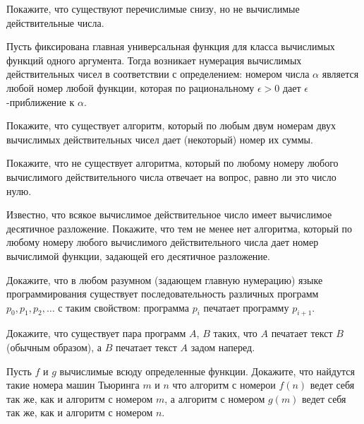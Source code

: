 \begin{task}
    Покажите, что существуют перечислимые снизу, но не вычислимые действительные числа.
\end{task}


\begin{definition}
    Пусть фиксирована главная универсальная функция для класса вычислимых функций одного аргумента. Тогда возникает нумерация
    вычислимых действительных чисел в соответствии с определением: номером числа $\alpha$ является любой номер любой функции,
    которая по рациональному $\epsilon > 0$ дает $\epsilon$-приближение к $\alpha$.
\end{definition}


\begin{task}
    Покажите, что существует алгоритм, который по любым двум номерам двух вычислимых действительных чисел дает (некоторый) номер
    их суммы.
\end{task}


\begin{task}
	Покажите, что не существует алгоритма, который по любому номеру любого вычислимого действительного числа отвечает на вопрос,
    равно ли это число нулю.
\end{task}


\begin{task}
    Известно, что всякое вычислимое действительное число имеет вычислимое десятичное разложение. Покажите, что тем не менее нет
    алгоритма, который по любому номеру любого вычислимого действительного числа дает номер вычислимой функции, задающей его
    десятичное разложение.
\end{task}

\begin{task}
    Докажите, что в любом разумном (задающем главную нумерацию) языке программирования существует последовательность различных
    программ $p_0, p_1, p_2, \dots$ с таким свойством: программа $p_i$ печатает программу $p_{i + 1}$. 
\end{task}


\begin{task}
    Докажите, что существует пара программ $A$, $B$ таких, что $A$ печатает текст $B$ (обычным образом), а $B$ печатает текст $A$
    задом наперед.
\end{task}

\begin{task}
    Пусть $f$ и $g$  вычислимые всюду определенные функции. Докажите, что найдутся такие номера машин Тьюринга $m$ и  $n$ что
    алгоритм с номерои $f(n)$ ведет себя так же, как и алгоритм с номером $m$, а алгоритм с номером $g(m)$ ведет себя так же, как
    и алгоритм с номером $n$.
\end{task}


